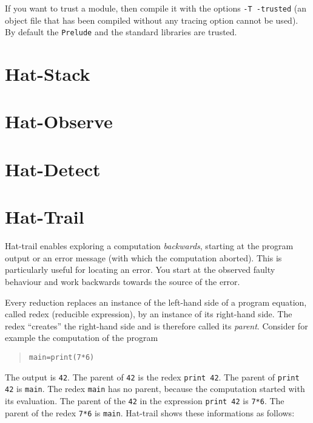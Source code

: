 \documentclass[12pt]{article}
\newenvironment{code}{\begin{quote}\begin{alltt}}{\end{alltt}\end{quote}}
\begin{document}
If you want to trust a module, then compile it with the options
\texttt{-T -trusted} (an object file that has been compiled without any tracing option cannot be used). By default the \texttt{Prelude} and the standard libraries are trusted. 



\section{Hat-Stack}


\section{Hat-Observe}


\section{Hat-Detect}


\section{Hat-Trail}


Hat-trail enables exploring a computation \emph{backwards}, starting at the program output or an error message (with which the computation aborted). This is particularly useful for locating an error. You start at the observed faulty behaviour and work backwards towards the source of the error. 

Every reduction replaces an instance of the left-hand side of a program equation, called redex (reducible expression), by an instance of its right-hand side. The redex ``creates'' the right-hand side and is therefore called its \emph{parent}. Consider for example the computation of the program
\begin{code}
main = print (7*6)
\end{code}
The output is \texttt{42}. The parent of \texttt{42} is the redex \texttt{print 42}. The parent of \texttt{print 42} is \texttt{main}. The redex \texttt{main} has no parent, because the computation started with its evaluation. The parent of the \texttt{42} in the expression \texttt{print 42} is \texttt{7*6}. The parent of the redex \texttt{7*6} is \texttt{main}. Hat-trail shows these informations as follows:
\end{document}
